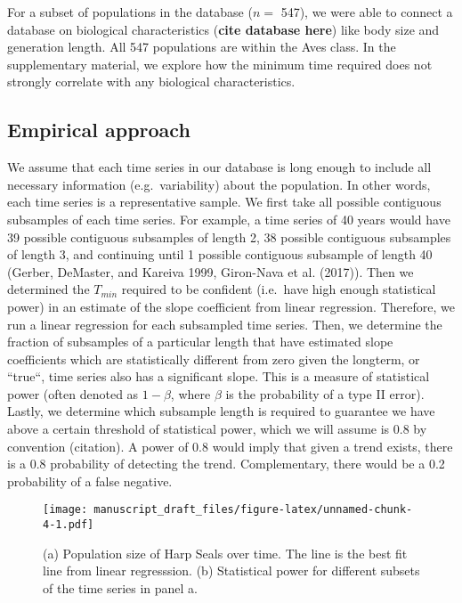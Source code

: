 \documentclass[12pt,]{article}
\begin{document}
For a subset of populations in the database (\(n =\) 547), we were able
to connect a database on biological characteristics (\textbf{cite
database here}) like body size and generation length. All 547
populations are within the Aves class. In the supplementary material, we
explore how the minimum time required does not strongly correlate with
any biological characteristics.

\subsection{Empirical approach}\label{empirical-approach}

We assume that each time series in our database is long enough to
include all necessary information (e.g.~variability) about the
population. In other words, each time series is a representative sample.
We first take all possible contiguous subsamples of each time series.
For example, a time series of 40 years would have 39 possible contiguous
subsamples of length 2, 38 possible contiguous subsamples of length 3,
and continuing until 1 possible contiguous subsample of length 40
(Gerber, DeMaster, and Kareiva 1999, Giron-Nava et al. (2017)). Then we
determined the \(T_{min}\) required to be confident (i.e.~have high
enough statistical power) in an estimate of the slope coefficient from
linear regression. Therefore, we run a linear regression for each
subsampled time series. Then, we determine the fraction of subsamples of
a particular length that have estimated slope coefficients which are
statistically different from zero given the longterm, or ``true``, time
series also has a significant slope. This is a measure of statistical
power (often denoted as \(1- \beta\), where \(\beta\) is the probability
of a type II error). Lastly, we determine which subsample length is
required to guarantee we have above a certain threshold of statistical
power, which we will assume is 0.8 by convention (citation). A power of
0.8 would imply that given a trend exists, there is a 0.8 probability of
detecting the trend. Complementary, there would be a 0.2 probability of
a false negative.

\begin{figure}[htbp]
\centering
\texttt{[image: manuscript\_draft\_files/figure-latex/unnamed-chunk-4-1.pdf]}
\caption{(a) Population size of Harp Seals over time. The line is the
best fit line from linear regresssion. (b) Statistical power for
different subsets of the time series in panel
a.\label{fig:empirical_approach_example}}
\end{figure}
\end{document}
